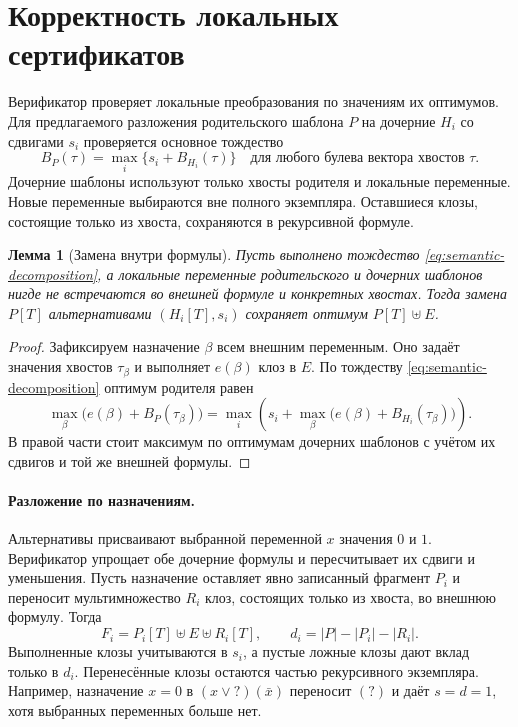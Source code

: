 \documentclass[10pt,twoside]{article}
\newcommand{\anytail}{\mathord{?}}
\newtheorem{lemma}[theorem]{Лемма}
\theoremstyle{definition}
\theoremstyle{remark}
\begin{document}
\section{Корректность локальных сертификатов}
\label{sec:verification}
\label{sec:implementation-checker}

Верификатор проверяет локальные преобразования по значениям их оптимумов.
Для предлагаемого разложения родительского шаблона $P$ на дочерние $H_i$
со сдвигами $s_i$ проверяется основное тождество
\begin{equation}
 B_P(\tau)=\max_i\{s_i+B_{H_i}(\tau)\}
 \quad\text{для любого булева вектора хвостов }\tau.
 \label{eq:semantic-decomposition}
\end{equation}
Дочерние шаблоны используют только хвосты родителя и локальные переменные.
Новые переменные выбираются вне полного экземпляра. Оставшиеся клозы,
состоящие только из хвоста, сохраняются в рекурсивной формуле.

\begin{lemma}[Замена внутри формулы]
\label{lem:contextual-replacement}
Пусть выполнено тождество \eqref{eq:semantic-decomposition}, а локальные
переменные родительского и дочерних шаблонов нигде не встречаются во
внешней формуле и конкретных хвостах. Тогда замена $P[T]$ альтернативами
$(H_i[T],s_i)$ сохраняет оптимум $P[T]\uplus E$.
\end{lemma}
\begin{proof}
Зафиксируем назначение $\beta$ всем внешним переменным. Оно задаёт
значения хвостов $\tau_\beta$ и выполняет $e(\beta)$ клоз в $E$.
По тождеству \eqref{eq:semantic-decomposition} оптимум родителя равен
\[
 \max_\beta\bigl(e(\beta)+B_P(\tau_\beta)\bigr)
 =\max_i\left(s_i+
   \max_\beta\bigl(e(\beta)+B_{H_i}(\tau_\beta)\bigr)\right).
\]
В правой части стоит максимум по оптимумам дочерних шаблонов с учётом
их сдвигов и той же внешней формулы.
\end{proof}

\paragraph{Разложение по назначениям.}
Альтернативы присваивают выбранной переменной $x$ значения $0$ и $1$.
Верификатор упрощает обе дочерние формулы и пересчитывает их сдвиги и
уменьшения. Пусть назначение оставляет явно записанный фрагмент $P_i$ и
переносит мультимножество $R_i$ клоз, состоящих только из хвоста, во
внешнюю формулу. Тогда
\begin{equation}
 F_i=P_i[T]\uplus E\uplus R_i[T],\qquad
 d_i=|P|-|P_i|-|R_i|.
 \label{eq:transfer}
\end{equation}
Выполненные клозы учитываются в $s_i$, а пустые ложные клозы дают вклад
только в $d_i$. Перенесённые клозы остаются частью рекурсивного
экземпляра. Например, назначение $x=0$ в $(x\vee\anytail)(\bar x)$
переносит $(\anytail)$ и даёт $s=d=1$, хотя выбранных переменных
больше нет.
\end{document}
